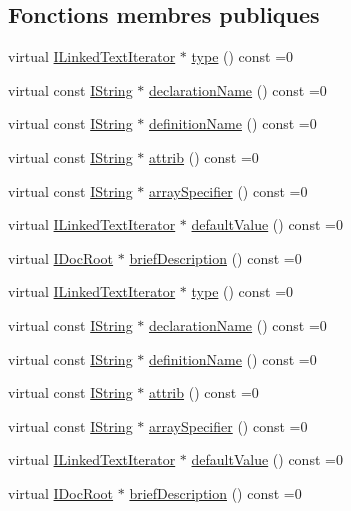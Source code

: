 \subsection*{Fonctions membres publiques}
\begin{DoxyCompactItemize}
\item 
virtual \hyperlink{class_i_linked_text_iterator}{I\+Linked\+Text\+Iterator} $\ast$ \hyperlink{class_i_param_a9a0e699a1691f990e89dc5625cac5436}{type} () const  =0
\item 
virtual const \hyperlink{class_i_string}{I\+String} $\ast$ \hyperlink{class_i_param_a45cca2e2e92457b1497174ccfc478c7d}{declaration\+Name} () const  =0
\item 
virtual const \hyperlink{class_i_string}{I\+String} $\ast$ \hyperlink{class_i_param_a7ee0584fe667caf468e558521a9d8e06}{definition\+Name} () const  =0
\item 
virtual const \hyperlink{class_i_string}{I\+String} $\ast$ \hyperlink{class_i_param_a25714151254ae9b2e5fed0032fa8cede}{attrib} () const  =0
\item 
virtual const \hyperlink{class_i_string}{I\+String} $\ast$ \hyperlink{class_i_param_a9cac90e623fa10bf4224ea5b93553822}{array\+Specifier} () const  =0
\item 
virtual \hyperlink{class_i_linked_text_iterator}{I\+Linked\+Text\+Iterator} $\ast$ \hyperlink{class_i_param_a819284d1a9677499b9fa5645a9d1ea38}{default\+Value} () const  =0
\item 
virtual \hyperlink{class_i_doc_root}{I\+Doc\+Root} $\ast$ \hyperlink{class_i_param_ab35530869d23fc1691bb44d998e16c52}{brief\+Description} () const  =0
\item 
virtual \hyperlink{class_i_linked_text_iterator}{I\+Linked\+Text\+Iterator} $\ast$ \hyperlink{class_i_param_a9a0e699a1691f990e89dc5625cac5436}{type} () const  =0
\item 
virtual const \hyperlink{class_i_string}{I\+String} $\ast$ \hyperlink{class_i_param_a45cca2e2e92457b1497174ccfc478c7d}{declaration\+Name} () const  =0
\item 
virtual const \hyperlink{class_i_string}{I\+String} $\ast$ \hyperlink{class_i_param_a7ee0584fe667caf468e558521a9d8e06}{definition\+Name} () const  =0
\item 
virtual const \hyperlink{class_i_string}{I\+String} $\ast$ \hyperlink{class_i_param_a25714151254ae9b2e5fed0032fa8cede}{attrib} () const  =0
\item 
virtual const \hyperlink{class_i_string}{I\+String} $\ast$ \hyperlink{class_i_param_a9cac90e623fa10bf4224ea5b93553822}{array\+Specifier} () const  =0
\item 
virtual \hyperlink{class_i_linked_text_iterator}{I\+Linked\+Text\+Iterator} $\ast$ \hyperlink{class_i_param_a819284d1a9677499b9fa5645a9d1ea38}{default\+Value} () const  =0
\item 
virtual \hyperlink{class_i_doc_root}{I\+Doc\+Root} $\ast$ \hyperlink{class_i_param_ab35530869d23fc1691bb44d998e16c52}{brief\+Description} () const  =0
\end{DoxyCompactItemize}


